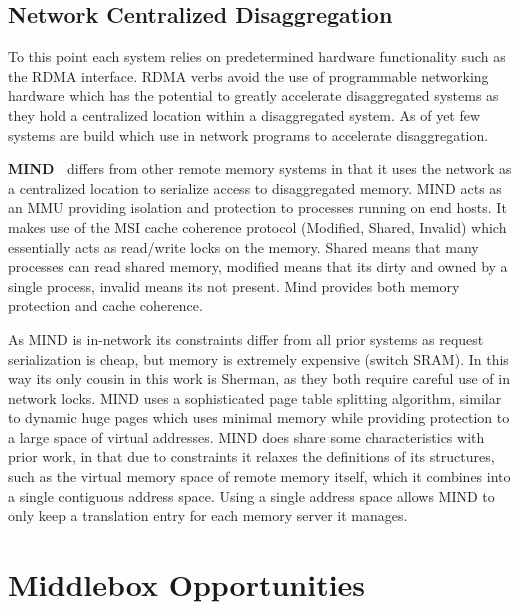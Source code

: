 
\subsection{Network Centralized Disaggregation}

To this point each system relies on predetermined hardware functionality such as
the RDMA interface. RDMA verbs avoid the use of programmable networking hardware
which has the potential to greatly accelerate disaggregated systems as they hold
a centralized location within a disaggregated system. As of yet few systems are
build which use in network programs to accelerate disaggregation.

\textbf{MIND~\cite{mind}} differs from other remote memory systems in that it
uses the network as a centralized location to serialize access to disaggregated
memory. MIND acts as an MMU providing isolation and protection to processes
running on end hosts. It makes use of the MSI cache coherence protocol (Modified,
Shared, Invalid) which essentially acts as read/write locks on the memory.
Shared means that many processes can read shared memory, modified means that
its dirty and owned by a single process, invalid means its not present.  Mind
provides both memory protection and cache coherence. 

As MIND is in-network its constraints differ from all prior systems as request
serialization is cheap, but memory is extremely expensive (switch SRAM). In this
way its only cousin in this work is Sherman, as they both require careful use of
in network locks. MIND uses a sophisticated page table splitting algorithm,
similar to dynamic huge pages which uses minimal memory while providing
protection to a large space of virtual addresses. MIND does share some
characteristics with prior work, in that due to constraints it relaxes the
definitions of its structures, such as the virtual memory space of remote memory
itself, which it combines into a single contiguous address space. Using a single
address space allows MIND to only keep a translation entry for each memory
server it manages.


\section{Middlebox Opportunities}

